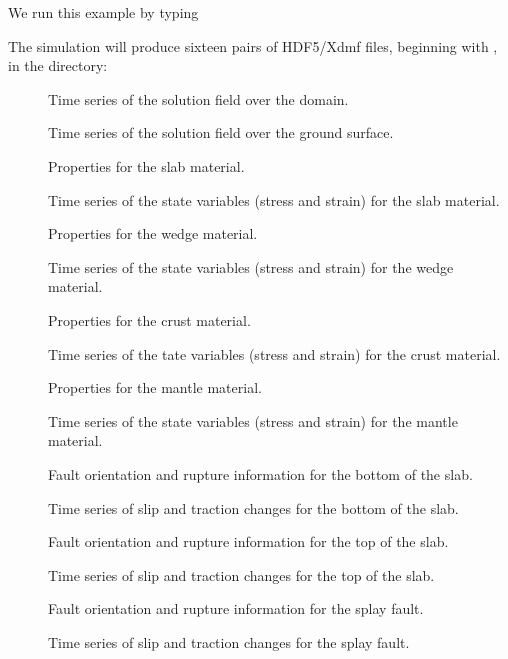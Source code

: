 We run this example by typing
The simulation will produce sixteen pairs of HDF5/Xdmf files,
beginning with , in the 
directory:
\begin{description}
\item[] Time series of the solution field over the domain.
\item[] Time series of the solution field over the ground surface.
\item[] Properties for
  the slab material.
\item[] Time series of the state variables (stress and strain) for the slab material.
\item[] Properties for
  the wedge material.
\item[] Time series of the state variables (stress and strain) for the wedge material.
\item[] Properties for
  the crust material.
\item[] Time series of the tate variables
  (stress and strain) for the crust material.
\item[] Properties for
  the mantle material.
\item[] Time series of the state variables
  (stress and strain) for the mantle material.
\item[] Fault orientation
  and rupture information for the bottom of the slab.
\item[] Time series of slip and
  traction changes for the bottom of the slab.
\item[] Fault orientation
  and rupture information for the top of the slab.
\item[] Time series of slip and
  traction changes for the top of the slab.
\item[] Fault orientation
  and rupture information for the splay fault.
\item[] Time series of slip and
  traction changes for the splay fault.
\end{description}

